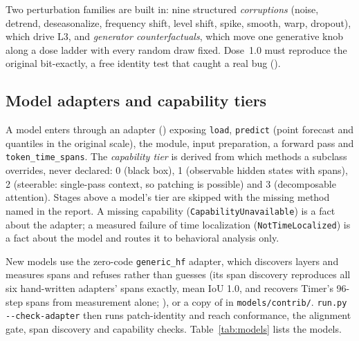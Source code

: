 Two perturbation families are built in: nine structured \emph{corruptions} (noise, detrend, deseasonalize,
frequency shift, level shift, spike, smooth, warp, dropout), which drive L3, and \emph{generator
counterfactuals}, which move one generative knob along a dose ladder with every random draw fixed. Dose~1.0
must reproduce the original bit-exactly, a free identity test that caught a real bug ().

\subsection{Model adapters and capability tiers}
\label{sec:adapters}

A model enters through an adapter () exposing \texttt{load},
\texttt{predict} (point forecast and quantiles in the original scale), the module, input preparation, a
forward pass and \texttt{token\_time\_spans}. The \emph{capability tier} is derived from which methods a
subclass overrides, never declared: 0 (black box), 1 (observable hidden states with spans), 2 (steerable:
single-pass context, so patching is possible) and 3 (decomposable attention). Stages above a model's tier
are skipped with the missing method named in the report. A missing capability
(\texttt{CapabilityUnavailable}) is a fact about the adapter; a measured failure of time localization
(\texttt{NotTimeLocalized}) is a fact about the model and routes it to behavioral analysis only.

New models use the zero-code \texttt{generic\_hf} adapter, which discovers layers and measures spans and
refuses rather than guesses (its span discovery reproduces all six hand-written adapters' spans exactly, mean
IoU 1.0, and recovers Timer's 96-step spans from measurement alone; ), or a copy of  in \texttt{models/contrib/}.
\texttt{run.py -{}-check-adapter} then runs patch-identity and reach conformance, the alignment gate, span
discovery and capability checks. Table~\ref{tab:models} lists the models.

